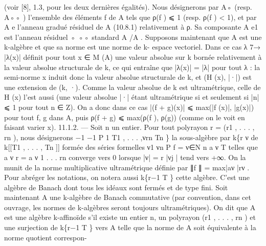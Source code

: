 \documentclass[
  10pt,
]{article}
\newenvironment{Shaded}{}{}
\newcommand{\NormalTok}[1]{#1}
\begin{document}
\begin{Shaded}
\begin{Highlighting}[]
\NormalTok{(voir [8], 1.3, pour les deux dernières égalités). Nous désignerons par A◦ (resp. A◦◦ )}
\NormalTok{l’ensemble des éléments f de A tels que ρ(f ) ⩽ 1 (resp. ρ(f ) \textless{} 1), et par A     e l’anneau}
\NormalTok{gradué résiduel de A (10.8.1) relativement à ρ. Sa composante A     e1 est l’anneau résiduel}
\NormalTok{            ◦    ◦◦}
\NormalTok{standard A /A .}
\NormalTok{   Supposons maintenant que A est une k{-}algèbre et que sa norme est une norme de k{-}}
\NormalTok{espace vectoriel. Dans ce cas λ 7→ |λ(x)| définit pour tout x ∈ M (A) une valeur absolue}
\NormalTok{sur k bornée relativement à la valeur absolue structurale de k, ce qui entraîne que}
\NormalTok{|λ(x)| = |λ| pour tout λ : la semi{-}norme x induit donc la valeur absolue structurale de k,}
\NormalTok{et (H (x), |·|) est une extension de (k, ·). Comme la valeur absolue de k est ultramétrique,}
\NormalTok{celle de H (x) l’est aussi (une valeur absolue |·| étant ultramétrique si et seulement si}
\NormalTok{|n| ⩽ 1 pour tout n ∈ Z). On a donc dans ce cas |(f + g)(x)| ⩽ max(|f (x)|, |g(x)|) pour}
\NormalTok{tout f, g dans A, puis ρ(f + g) ⩽ max(ρ(f ), ρ(g)) (comme on le voit en faisant varier x).}
\NormalTok{11.1.2. — Soit n un entier. Pour tout polyrayon r = (r1 , . . . , rn ), nous désignerons}
\NormalTok{         −1             −1}
\NormalTok{      P 1 T1 , . . . ,νrn Tn \} la sous{-}algèbre}
\NormalTok{par k\{r}
\NormalTok{                                         ν}
\NormalTok{                                                   de k[[T1 , . . . , Tn ]] formée des séries formelles}
\NormalTok{                                                  ν1      νn}
\NormalTok{                                                                                                 P}
\NormalTok{f =      ν∈N n a ν T    telles que a ν r   = a ν 1 . . . rn converge vers 0 lorsque |ν| =}
\NormalTok{                                                r                                                  |νj |}
\NormalTok{tend vers +∞. On la munit de la norme multiplicative ultramétrique définie par ∥f ∥ =}
\NormalTok{max|aν |rν . Pour abréger les notations, on notera aussi k\{r−1 T \} cette algèbre. C’est une}
\NormalTok{algèbre de Banach dont tous les idéaux sont fermés et de type fini.}
\NormalTok{   Soit maintenant A une k{-}algèbre de Banach commutative (par convention, dans cet}
\NormalTok{ouvrage, les normes de k{-}algèbres seront toujours ultramétriques). On dit que A est une}
\NormalTok{algèbre k{-}affinoïde s’il existe un entier n, un polyrayon (r1 , . . . , rn ) et une surjection de}
\NormalTok{k\{r−1 T \} vers A telle que la norme de A soit équivalente à la norme quotient correspon{-}}

\end{Highlighting}
\end{Shaded}
\end{document}
